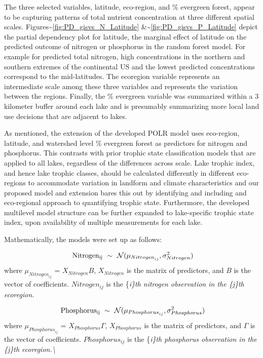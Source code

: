 \documentclass[fleqn,10pt,lineno]{wlpeerj} %
\begin{document}
The three selected variables, latitude, eco-region, and \% evergreen forest, appear to be capturing patterns of total nutrient concentration at three different spatial scales.
Figures\textasciitilde{}\ref{fig:PD_gisvs_N_Latitude} \&\textasciitilde{}\ref{fig:PD_gisvs_P_Latitude} depict the partial dependency plot for latitude, the marginal effect of latitude on the predicted outcome of nitrogen or phosphorus in the random forest model. For example for predicted total nitrogen, high concentrations in the northern and southern extremes of the continental US and the lowest predicted concentrations correspond to the mid-latitudes. The ecoregion variable represents an intermediate scale among these three variables and represents the variation between the regions. Finally, the \% evergreen variable was summarized within a 3 kilometer buffer around each lake and is presumably summarizing more local land use decisions that are adjacent to lakes.

As mentioned, the extension of the developed POLR model uses eco-region, latitude, and watershed level \% evergreen forest as predictors for nitrogen and phosphorus. This contrasts with prior trophic state classification models that are applied to all lakes, regardless of the differences across scale. Lake trophic index, and hence lake trophic classes, should be calculated differently in different eco-regions to accommodate variation in landform and climate characteristics and our proposed model and extension bares this out by identifying and including and eco-regional approach to quantifying trophic state. Furthermore, the developed multilevel model structure can be further expanded to lake-specific trophic state index, upon availability of multiple measurements for each lake.

Mathematically, the models were set up as follows:

\begin{equation}
\mathrm{  \ Nitrogen_{ij}} \ \sim \ \mathcal{N}( \mu_{{Nitrogen}_{ij}},\sigma_{Nitrogen}^2)\\
\end{equation}
where \(\mu_{{Nitrogen}_{ij}}\) = \(X_{Nitrogen}B\), \(X_{Nitrogen}\) is the matrix of predictors, and \(B\) is the vector of coefficients. \(Nitrogen_{ij}\) is the \{\it i\}th nitrogen observation in the \{\it j\}th ecoregion.

\begin{equation}
\mathrm{  \ Phosphorus_{ij}} \ \sim \ \mathcal{N}( \mu_{{Phosphorus}_{ij}},\sigma_{Phosphorus}^2)\\
\end{equation}
where \(\mu_{{Phosphorus}_{ij}}\) = \(X_{Phosphorus}\Gamma\), \(X_{Phosphorus}\) is the matrix of predictors, and \(\Gamma\) is the vector of coefficients. \(Phosphorus_{ij}\) is the \{\it i\}th phosphorus observation in the \{\it j\}th ecoregion.\textbackslash{}
\end{document}
